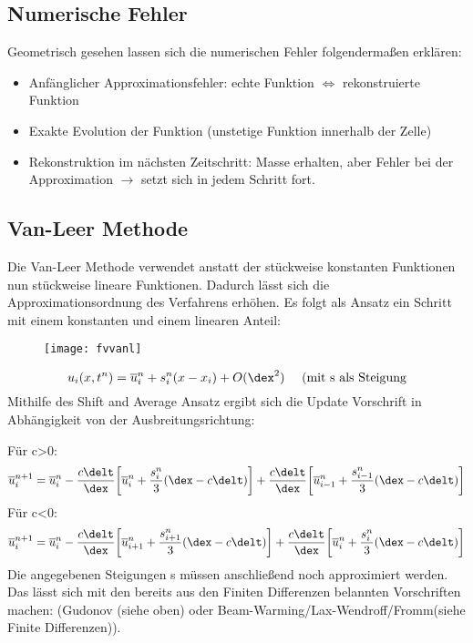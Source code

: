 \subsection{Numerische Fehler}
Geometrisch gesehen lassen sich die numerischen Fehler folgenderma\ss{}en erkl\"aren:
\begin{itemize}
	\item Anf\"anglicher Approximationsfehler: echte Funktion $\Leftrightarrow$ rekonstruierte Funktion
	\item Exakte Evolution der Funktion (unstetige Funktion innerhalb der Zelle)
	\item Rekonstruktion im n\"achsten Zeitschritt: Masse erhalten, aber Fehler bei der Approximation $\rightarrow$ setzt sich in jedem Schritt fort.
\end{itemize}


\subsection{Van-Leer Methode}
Die Van-Leer Methode verwendet anstatt der st\"uckweise konstanten Funktionen nun st\"uckweise lineare Funktionen. Dadurch l\"asst sich die Approximationsordnung des Verfahrens erh\"ohen. Es folgt als Ansatz ein Schritt mit einem konstanten und einem linearen Anteil:
\par
\begin{figure}[ht]
	\centering
	\texttt{[image: fvvanl]}
\end{figure}
\begin{equation*}
	u_i(x,t^n) = \overline{u}_i^n + s_i^n(x-x_i) + O(\dex^2)~~~~\textrm{(mit s als Steigung}
\end{equation*} 
Mithilfe des Shift and Average Ansatz ergibt sich die Update Vorschrift in Abh\"angigkeit von der Ausbreitungsrichtung:
\par
F\"ur c>0:\\
\begin{equation*}
	\overline{u}^{n+1}_i = \overline{u}_i^n - \frac{c\delt}{\dex}\bigg[\overline{u}_i^n + \frac{s_i^n}{3}(\dex-c\delt)\bigg] + \frac{c\delt}{\dex}\bigg[\overline{u}_{i-1}^n + \frac{s_{i-1}^n}{3}(\dex-c\delt)\bigg]
\end{equation*}
F\"ur c<0:\\
\begin{equation*}
	\overline{u}^{n+1}_i = \overline{u}_i^n - \frac{c\delt}{\dex}\bigg[\overline{u}_{i+1}^n + \frac{s_{i+1}^n}{3}(\dex-c\delt)\bigg] + \frac{c\delt}{\dex}\bigg[\overline{u}_{i}^n + \frac{s_{i}^n}{3}(\dex-c\delt)\bigg]
\end{equation*}
Die angegebenen Steigungen s m\"ussen anschlie\ss{}end noch approximiert werden. Das l\"asst sich mit den bereits aus den Finiten Differenzen belannten Vorschriften machen: (Gudonov (siehe oben) oder Beam-Warming/Lax-Wendroff/Fromm(siehe Finite Differenzen)).

